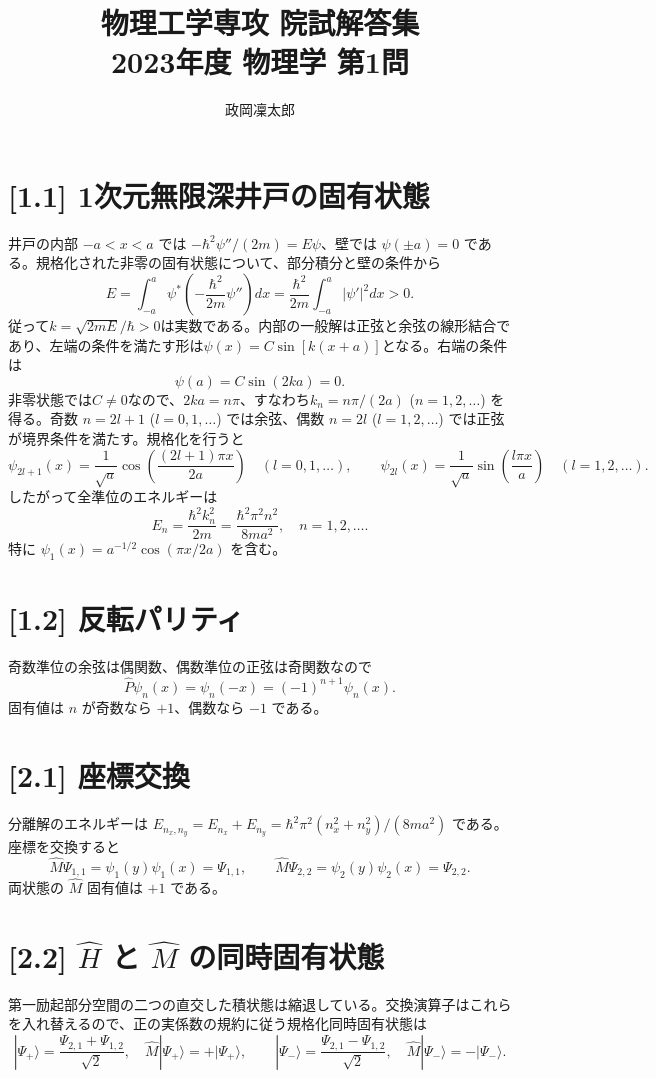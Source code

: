 \documentclass[11pt,a4paper]{article}
\title{物理工学専攻 院試解答集\\2023年度 物理学 第1問}
\author{政岡凜太郎}
\date{}
\begin{document}
\maketitle

\section*{[1.1] 1次元無限深井戸の固有状態}
井戸の内部 $-a<x<a$ では $-\hbar^2\psi''/(2m)=E\psi$、壁では $\psi(\pm a)=0$ である。規格化された非零の固有状態について、部分積分と壁の条件から
\begin{equation}
 E=\int_{-a}^a\psi^*\!\left(-\frac{\hbar^2}{2m}\psi''\right)dx
 =\frac{\hbar^2}{2m}\int_{-a}^a|\psi'|^2dx>0.
\end{equation}
従って$k=\sqrt{2mE}/\hbar>0$は実数である。内部の一般解は正弦と余弦の線形結合であり、左端の条件を満たす形は$\psi(x)=C\sin[k(x+a)]$となる。右端の条件は
\begin{equation}
 \psi(a)=C\sin(2ka)=0.
\end{equation}
非零状態では$C\ne0$なので、$2ka=n\pi$、すなわち$k_n=n\pi/(2a)$ ($n=1,2,\ldots$) を得る。奇数 $n=2l+1$ ($l=0,1,\ldots$) では余弦、偶数 $n=2l$ ($l=1,2,\ldots$) では正弦が境界条件を満たす。規格化を行うと
\[
\boxed{\psi_{2l+1}(x)=\frac1{\sqrt a}\cos\!\left(\frac{(2l+1)\pi x}{2a}\right)\quad(l=0,1,\ldots)},\qquad
\boxed{\psi_{2l}(x)=\frac1{\sqrt a}\sin\!\left(\frac{l\pi x}{a}\right)\quad(l=1,2,\ldots)}.
\]
したがって全準位のエネルギーは
\[
\boxed{E_n=\frac{\hbar^2 k_n^2}{2m}=\frac{\hbar^2\pi^2n^2}{8ma^2}},\quad n=1,2,\ldots.
\]
特に $\psi_1(x)=a^{-1/2}\cos(\pi x/2a)$ を含む。

\section*{[1.2] 反転パリティ}
奇数準位の余弦は偶関数、偶数準位の正弦は奇関数なので
\[
\hat P\psi_n(x)=\psi_n(-x)=\boxed{(-1)^{n+1}\psi_n(x)}.
\]
固有値は $n$ が奇数なら $+1$、偶数なら $-1$ である。

\section*{[2.1] 座標交換}
分離解のエネルギーは $E_{n_x,n_y}=E_{n_x}+E_{n_y}=\hbar^2\pi^2(n_x^2+n_y^2)/(8ma^2)$ である。座標を交換すると
\[
\hat M\Psi_{1,1}=\psi_1(y)\psi_1(x)=\Psi_{1,1},\qquad
\hat M\Psi_{2,2}=\psi_2(y)\psi_2(x)=\Psi_{2,2}.
\]
両状態の $\hat M$ 固有値は $+1$ である。

\section*{[2.2] $\hat H$ と $\hat M$ の同時固有状態}
第一励起部分空間の二つの直交した積状態は縮退している。交換演算子はこれらを入れ替えるので、正の実係数の規約に従う規格化同時固有状態は
\[
\boxed{|\Psi_+\rangle=\frac{\Psi_{2,1}+\Psi_{1,2}}{\sqrt2},\quad \hat M|\Psi_+\rangle=+|\Psi_+\rangle},\qquad
\boxed{|\Psi_-\rangle=\frac{\Psi_{2,1}-\Psi_{1,2}}{\sqrt2},\quad \hat M|\Psi_-\rangle=-|\Psi_-\rangle}.
\]
\end{document}
